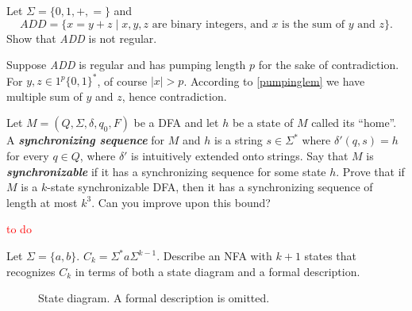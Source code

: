 \begin{exercise}
  Let $\Sigma = \{0, 1, +, =\}$ and
  \[
    \textit{ADD} = \{x = y + z \mid x, y, z \text{ are binary integers, and } x \text{ is the sum of } y \text{ and } z\}.
  \]
  Show that \textit{ADD} is not regular.
\end{exercise}

Suppose \textit{ADD} is regular and has pumping length $p$ for the sake of contradiction. For $y,z\in1^p\{0,1\}^*$, of course $|x|>p$. According to \ref{pumpinglem} we have multiple sum of $y$ and $z$, hence contradiction.

\setcounter{exercise}{58}

\begin{exercise}
  Let $M = (Q, \Sigma, \delta, q_0, F)$ be a DFA and let $h$ be a state of $M$ called its ``home''. A \textbf{\textit{synchronizing sequence}} for $M$ and $h$ is a string $s \in \Sigma^*$ where $\delta'(q, s) = h$ for every $q \in Q$, where $\delta'$ is intuitively extended onto strings. Say that $M$ is \textbf{\textit{synchronizable}} if it has a synchronizing sequence for some state $h$. Prove that if $M$ is a $k$-state synchronizable DFA, then it has a synchronizing sequence of length at most $k^3$. Can you improve upon this bound?
\end{exercise}

\textcolor{red}{to do}

\begin{exercise}
  Let $\Sigma = \{a, b\}$. $C_k = \Sigma^* a \Sigma^{k-1}$. Describe an NFA with $k + 1$ states that recognizes $C_k$ in terms of both a state diagram and a formal description.
\end{exercise}

\begin{figure}[H]
  \centering
  \caption{State diagram. A formal description is omitted.}
\end{figure}

